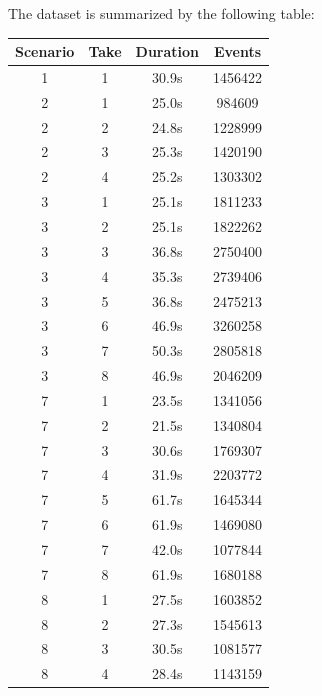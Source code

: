 The dataset is summarized by the following table:\\
\begin{center}
\begin{tabular}{ | c | c | c | c | }
	\hline		
	Scenario & Take & Duration & Events\\
	\hline	
	\hline	
	1 & 1 & 30.9s & 1456422\\
	2 & 1 & 25.0s & 984609\\
	2 & 2 & 24.8s & 1228999\\
	2 & 3 & 25.3s & 1420190\\
	2 & 4 & 25.2s & 1303302\\
	3 & 1 & 25.1s & 1811233\\
	3 & 2 & 25.1s & 1822262\\
	3 & 3 & 36.8s & 2750400\\
	3 & 4 & 35.3s & 2739406\\
	3 & 5 & 36.8s & 2475213\\
	3 & 6 & 46.9s & 3260258\\
	3 & 7 & 50.3s & 2805818\\
	3 & 8 & 46.9s & 2046209\\
	7 & 1 & 23.5s & 1341056\\
	7 & 2 & 21.5s & 1340804\\
	7 & 3 & 30.6s & 1769307\\
	7 & 4 & 31.9s & 2203772\\
	7 & 5 & 61.7s & 1645344\\
	7 & 6 & 61.9s & 1469080\\
	7 & 7 & 42.0s & 1077844\\
	7 & 8 & 61.9s & 1680188\\
	8 & 1 & 27.5s & 1603852\\
	8 & 2 & 27.3s & 1545613\\
	8 & 3 & 30.5s & 1081577\\
	8 & 4 & 28.4s & 1143159\\                     
	\hline			
\end{tabular}
\end{center}



